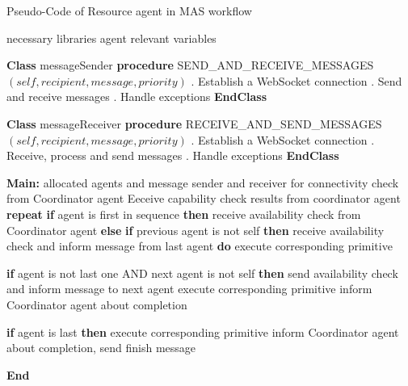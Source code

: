 \begin{algorithm}
    \caption{Pseudo-Code of Resource agent in MAS workflow}
    \label{alg:RAPseudoCode}
    \begin{algorithmic}
     necessary libraries
     agent relevant variables
    
    \State \textbf{Class} messageSender
    \State \textbf{\qquad procedure} {SEND\_AND\_RECEIVE\_MESSAGES$(self, recipient, message, priority)$}
    \State \qquad {}. Establish a WebSocket connection
    \State \qquad {}. Send and receive messages
    \State \qquad {}. Handle exceptions
\State \textbf{EndClass}

\State \textbf{Class} messageReceiver
    \State \textbf{\qquad procedure} {RECEIVE\_AND\_SEND\_MESSAGES$(self, recipient, message, priority)$}
    \State \qquad {}. Establish a WebSocket connection
    \State \qquad {}. Receive, process and send messages
    \State \qquad {}. Handle exceptions
\State \textbf{EndClass}
   
    \State \textbf{Main:}
     allocated agents and message sender and receiver
     for connectivity check from Coordinator agent
    \State {\qquad} Eeceive capability check results from coordinator agent
    \State \textbf{\qquad repeat}
    \State \textbf{\qquad \qquad if} {agent is first in sequence} \textbf{then}
         receive availability check from Coordinator agent
        \State \textbf{\qquad \qquad else}
        \State \textbf{\qquad \qquad \qquad if} {previous agent is not self} \textbf{then}
             receive availability check and inform message from last agent
            \State \textbf{\qquad \qquad \qquad do} execute corresponding primitive
        
            \State \textbf{\qquad \qquad \qquad if} {agent is not last one AND next agent is not self} \textbf{then}
            \State \textbf{\qquad \qquad \qquad \qquad} send availability check and inform message to next agent
            \State \textbf{\qquad \qquad \qquad \qquad} execute corresponding primitive
            \State \textbf{\qquad \qquad \qquad \qquad} inform Coordinator agent about completion
         
            \State \textbf{\qquad \qquad \qquad if} {agent is last} \textbf{then}
            \State \textbf{\qquad \qquad \qquad \qquad} execute corresponding primitive
            \State \textbf{\qquad \qquad \qquad \qquad} inform Coordinator agent about completion, send finish message
    
    \State \textbf{\qquad End} 
    \end{algorithmic}
    \end{algorithm}

